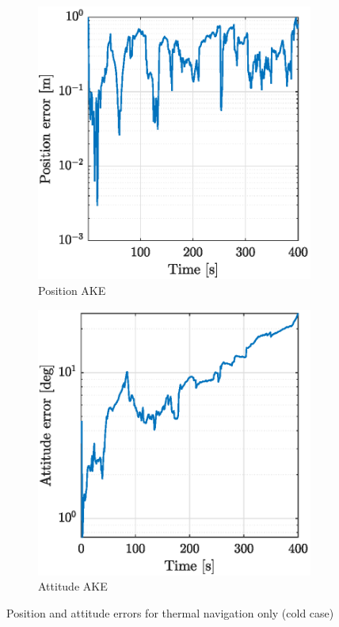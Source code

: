 \begin{figure}[!h]
    \begin{subfigure}{0.48\linewidth}
    \centering
    \includegraphics[width = 1\linewidth]{Images/eclipseerrpos.eps}
    \caption{Position AKE}
    \label{fig:eclipsepos}
    \end{subfigure}\hfill
    \begin{subfigure}{0.48\linewidth}
    \centering
    \includegraphics[width = 1\linewidth]{Images/eclipseerratt.eps}
    \caption{Attitude AKE}
    \label{fig:eclispeatt}
    \end{subfigure}
    \caption{Position and attitude errors for thermal navigation only (cold case)}
    \label{fig:Teclipsr_posatt}
\end{figure}
